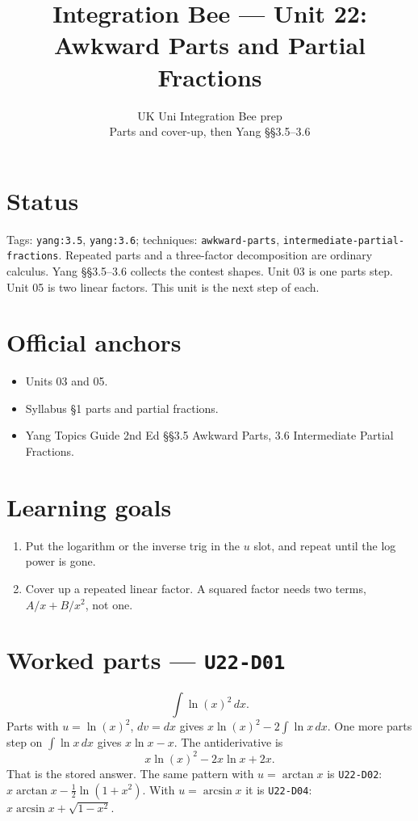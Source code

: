 
\title{Integration Bee --- Unit 22:\\ Awkward Parts and Partial Fractions}
\author{UK Uni Integration Bee prep\\ Parts and cover-up, then Yang \S\S3.5--3.6}
\date{}

\maketitle
\section*{Status}
Tags: \texttt{yang:3.5}, \texttt{yang:3.6}; techniques: \texttt{awkward-parts}, \texttt{intermediate-partial-fractions}.
Repeated parts and a three-factor decomposition are ordinary calculus. Yang \S\S3.5--3.6 collects the contest shapes. Unit 03 is one parts step. Unit 05 is two linear factors. This unit is the next step of each.
\section{Official anchors}
\begin{itemize}
\item Units 03 and 05.
\item Syllabus \S1 parts and partial fractions.
\item Yang Topics Guide 2nd Ed \S\S3.5 Awkward Parts, 3.6 Intermediate Partial Fractions.
\end{itemize}
\section{Learning goals}
\begin{enumerate}
  \item Put the logarithm or the inverse trig in the $u$ slot, and repeat until the log power is gone.
  \item Cover up a repeated linear factor. A squared factor needs two terms, $A/x+B/x^2$, not one.
\end{enumerate}

\section{Worked parts --- \texttt{U22-D01}}
\[
\int\ln(x)^2\,dx.
\]
Parts with $u=\ln(x)^2$, $dv=dx$ gives $x\ln(x)^2-2\int\ln x\,dx$. One more parts step on $\int\ln x\,dx$ gives $x\ln x-x$. The antiderivative is
\[
x\ln(x)^2-2x\ln x+2x.
\]
That is the stored answer. The same pattern with $u=\arctan x$ is \texttt{U22-D02}: $x\arctan x-\frac12\ln(1+x^2)$. With $u=\arcsin x$ it is \texttt{U22-D04}: $x\arcsin x+\sqrt{1-x^2}$.

